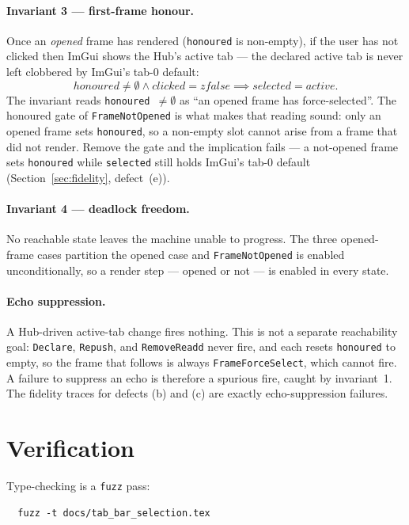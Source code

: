 \documentclass[a4paper,10pt,fleqn]{article}
\begin{document}
\paragraph{Invariant 3 --- first-frame honour.}
Once an \emph{opened} frame has rendered (\texttt{honoured} is non-empty), if
the user has not clicked then ImGui shows the Hub's active tab --- the declared
active tab is never left clobbered by ImGui's tab-0 default:
\[
  honoured \neq \emptyset \land clicked = zfalse \implies selected = active.
\]
The invariant reads \texttt{honoured $\neq \emptyset$} as ``an opened frame has
force-selected''.  The honoured gate of \texttt{FrameNotOpened} is what makes
that reading sound: only an opened frame sets \texttt{honoured}, so a non-empty
slot cannot arise from a frame that did not render.  Remove the gate and the
implication fails --- a not-opened frame sets \texttt{honoured} while
\texttt{selected} still holds ImGui's tab-0 default (Section~\ref{sec:fidelity},
defect~(e)).

\paragraph{Invariant 4 --- deadlock freedom.}
No reachable state leaves the machine unable to progress.  The three opened-frame
cases partition the opened case and \texttt{FrameNotOpened} is enabled
unconditionally, so a render step --- opened or not --- is enabled in every
state.

\paragraph{Echo suppression.}
A Hub-driven active-tab change fires nothing.  This is not a separate
reachability goal: \texttt{Declare}, \texttt{Repush}, and \texttt{RemoveReadd}
never fire, and each resets \texttt{honoured} to empty, so the frame that
follows is always \texttt{FrameForceSelect}, which cannot fire.  A failure to
suppress an echo is therefore a spurious fire, caught by invariant~1.  The
fidelity traces for defects (b) and (c) are exactly echo-suppression failures.

\section{Verification}
\label{sec:verify}

Type-checking is a \texttt{fuzz} pass:
\begin{verbatim}
  fuzz -t docs/tab_bar_selection.tex
\end{verbatim}
\end{document}
